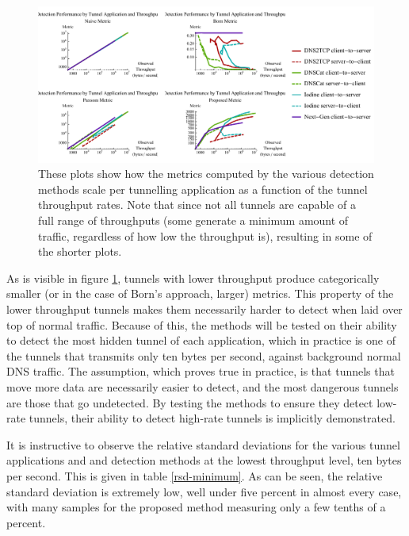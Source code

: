\documentclass[12pt]{report}
\theoremstyle{remark}
\theoremstyle{definition}
\theoremstyle{definition}
\theoremstyle{definition}
\begin{document}
\begin{figure}
\centering
\includegraphics[width=\textwidth]{figures/mpbtt.pdf}
\caption[Scaling of Detection Metrics by Tunnel Throughput]{These plots show how
the metrics computed by the various detection methods scale per tunnelling
application as a function of the tunnel throughput rates. Note that since not
all tunnels are capable of a full range of throughputs (some generate a minimum
amount of traffic, regardless of how low the throughput is), resulting in some
of the shorter plots.}
\label{mbtt}
\end{figure}

As is visible in figure \ref{mbtt}, tunnels with lower throughput produce
categorically smaller (or in the case of Born's approach, larger) metrics. This
property of the lower throughput tunnels makes them necessarily harder to detect
when laid over top of normal traffic. Because of this, the methods will be
tested on their ability to detect the most hidden tunnel of each application,
which in practice is one of the tunnels that transmits only ten bytes per
second, against background normal DNS traffic. The assumption, which proves true
in practice, is that tunnels that move more data are necessarily easier to
detect, and the most dangerous tunnels are those that go undetected. By testing
the methods to ensure they detect low-rate tunnels, their ability to detect
high-rate tunnels is implicitly demonstrated.

It is instructive to observe the relative standard deviations for the various
tunnel applications and and detection methods at the lowest throughput level,
ten bytes per second. This is given in table \ref{rsd-minimum}. As can be seen,
the relative standard deviation is extremely low, well under five percent in
almost every case, with many samples for the proposed method measuring only a
few tenths of a percent.
\end{document}
